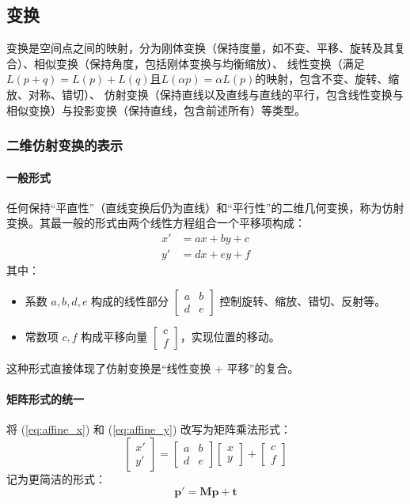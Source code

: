 \documentclass[12pt]{article}
\begin{document}
\subsection{变换}

变换是空间点之间的映射，分为刚体变换（保持度量，如不变、平移、旋转及其复合）、相似变换（保持角度，包括刚体变换与均衡缩放）、
线性变换（满足$L(p+q) = L(p) + L(q)$且$L(\alpha p) = \alpha L(p)$的映射，包含不变、旋转、缩放、对称、错切）、
仿射变换（保持直线以及直线与直线的平行，包含线性变换与相似变换）与投影变换（保持直线，包含前述所有）等类型。

\subsubsection{二维仿射变换的表示}

\paragraph{一般形式}
任何保持“平直性”（直线变换后仍为直线）和“平行性”的二维几何变换，称为仿射变换。其最一般的形式由两个线性方程组合一个平移项构成：
\begin{align}
    x' &= a x + b y + c \label{eq:affine_x} \\
    y' &= d x + e y + f \label{eq:affine_y}
\end{align}
其中：
\begin{itemize}
    \item 系数 $a, b, d, e$ 构成的线性部分 $\begin{bmatrix} a & b \\ d & e \end{bmatrix}$ 控制旋转、缩放、错切、反射等。
    \item 常数项 $c, f$ 构成平移向量 $\begin{bmatrix} c \\ f \end{bmatrix}$，实现位置的移动。
\end{itemize}
这种形式直接体现了仿射变换是“线性变换 + 平移”的复合。

\paragraph{矩阵形式的统一}
将 (\ref{eq:affine_x}) 和 (\ref{eq:affine_y}) 改写为矩阵乘法形式：
\[
\begin{bmatrix} x' \\ y' \end{bmatrix} =
\begin{bmatrix} a & b \\ d & e \end{bmatrix}
\begin{bmatrix} x \\ y \end{bmatrix} +
\begin{bmatrix} c \\ f \end{bmatrix}
\]
记为更简洁的形式：
\begin{equation}
    \mathbf{p}' = \mathbf{M} \mathbf{p} + \mathbf{t}
    \label{eq:matrix_form}
\end{equation}
\end{document}
